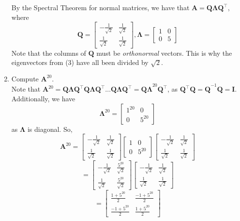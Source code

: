 \documentclass{article}
\begin{document}
\begin{enumerate}[label=\arabic*.]
{\color{blue} By the Spectral Theorem for normal matrices, we have that $\mathbf{A} = \mathbf{Q\Lambda Q^{\top}}$, where $$\mathbf{Q} = \begin{bmatrix} -\frac{1}{\sqrt{2}} & \frac{1}{\sqrt{2}} \\ \frac{1}{\sqrt{2}} & \frac{1}{\sqrt{2}} \end{bmatrix}, \mathbf{\Lambda} = \begin{bmatrix} 1 & 0 \\ 0 & 5 \end{bmatrix}$$ Note that the columns of $\mathbf{Q}$ must be \textit{orthonormal} vectors. This is why the eigenvectors from (3) have all been divided by $\sqrt{2}$.}
\item Compute $\mathbf{A}^{20}$. \\
{\color{blue} Note that $\mathbf{A}^{20} = \mathbf{Q\Lambda Q^{\top}Q\Lambda Q^{\top}\hdots Q\Lambda Q^{\top} = Q\Lambda}^{20}\mathbf{Q^{\top}}$, as $\mathbf{Q^{\top}Q = Q}^{-1}\mathbf{Q = I}$. Additionally, we have $$\mathbf{\Lambda}^{20} = \begin{bmatrix} 1^{20} & 0 \\ 0 & 5^{20}\end{bmatrix}$$ as $\mathbf{\Lambda}$ is diagonal. So, $$\mathbf{A}^{20} = \begin{bmatrix} -\frac{1}{\sqrt{2}} & \frac{1}{\sqrt{2}} \\ \frac{1}{\sqrt{2}} & \frac{1}{\sqrt{2}} \end{bmatrix} \begin{bmatrix} 1 & 0 \\ 0 & 5^{20}\end{bmatrix}\begin{bmatrix} -\frac{1}{\sqrt{2}} & \frac{1}{\sqrt{2}} \\ \frac{1}{\sqrt{2}} & \frac{1}{\sqrt{2}} \end{bmatrix}$$ $$=\begin{bmatrix} -\frac{1}{\sqrt{2}} & \frac{5^{20}}{\sqrt{2}} \\ \frac{1}{\sqrt{2}} & \frac{5^{20}}{\sqrt{2}} \end{bmatrix}\begin{bmatrix} -\frac{1}{\sqrt{2}} & \frac{1}{\sqrt{2}} \\ \frac{1}{\sqrt{2}} & \frac{1}{\sqrt{2}} \end{bmatrix}$$ $$ = \begin{bmatrix} \frac{1 + 5^{20}}{2} & \frac{-1 + 5^{20}}{2} \\ \frac{-1 + 5^{20}}{2} &\frac{1 + 5^{20}}{2} \end{bmatrix}$$ }
\end{enumerate}
\end{document}
